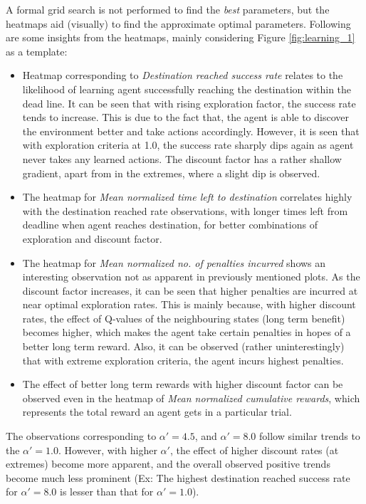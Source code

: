 \documentclass{article}
\begin{document}
	A formal grid search is not performed to find the \emph{best} parameters, but the heatmaps aid (visually) to find the approximate optimal parameters. Following are some insights from the heatmaps, mainly considering Figure \ref{fig:learning_1} as a template:
	\begin{itemize}
		\item Heatmap corresponding to \emph{Destination reached success rate} relates to the likelihood of learning agent successfully reaching the destination within the dead line. It can be seen that with rising exploration factor, the success rate tends to increase. This is due to the fact that, the agent is able to discover the environment better and take actions accordingly. However, it is seen that with exploration criteria at 1.0, the success rate sharply dips again as agent never takes any learned actions. The discount factor has a rather shallow gradient, apart from in the extremes, where a slight dip is observed.
		\item The heatmap for \emph{Mean normalized time left to destination} correlates highly with the destination reached rate observations, with longer times left from deadline when agent reaches destination, for better combinations of exploration and discount factor.
		\item The heatmap for \emph{Mean normalized no. of penalties incurred} shows an interesting observation not as apparent in previously mentioned plots. As the discount factor increases, it can be seen that higher penalties are incurred at near optimal exploration rates. This is mainly because, with higher discount rates, the effect of Q-values of the neighbouring states (long term benefit) becomes higher, which makes the agent take certain penalties in hopes of a better long term reward. Also, it can be observed (rather uninterestingly) that with extreme exploration criteria, the agent incurs highest penalties.
		\item The effect of better long term rewards with higher discount factor can be observed even in the heatmap of \emph{Mean normalized cumulative rewards}, which represents the total reward an agent gets in a particular trial.
	\end{itemize}
	
	The observations corresponding to $\alpha\prime = 4.5$, and $\alpha\prime = 8.0$ follow similar trends to the $\alpha\prime = 1.0$. However, with higher $\alpha\prime$, the effect of higher discount rates (at extremes) become more apparent, and the overall observed positive trends become much less prominent (Ex: The highest destination reached success rate for $\alpha\prime = 8.0$ is lesser than that for $\alpha\prime = 1.0$).
	
\end{document}
